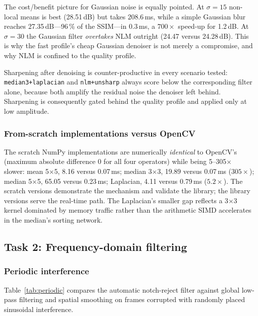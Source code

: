\documentclass[conference,10pt]{IEEEtran}
\begin{document}
The cost/benefit picture for Gaussian noise is equally pointed. At
$\sigma{=}15$ non-local means is best (28.51\,dB) but takes 208.6\,ms, while a
simple Gaussian blur reaches 27.35\,dB---96\,\% of the SSIM---in 0.3\,ms, a
$700\times$ speed-up for 1.2\,dB. At $\sigma{=}30$ the Gaussian filter
\emph{overtakes} NLM outright (24.47 versus 24.28\,dB). This is why the
\textsf{fast} profile's cheap Gaussian denoiser is not merely a compromise, and
why NLM is confined to the \textsf{quality} profile.

Sharpening after denoising is counter-productive in every scenario tested:
\texttt{median3+laplacian} and \texttt{nlm+unsharp} always score below the
corresponding filter alone, because both amplify the residual noise the
denoiser left behind. Sharpening is consequently gated behind the
\textsf{quality} profile and applied only at low amplitude.

\subsubsection{From-scratch implementations versus OpenCV}
The scratch NumPy implementations are numerically \emph{identical} to OpenCV's
(maximum absolute difference 0 for all four operators) while being
5--305$\times$ slower: mean 5$\times$5, 8.16 versus 0.07\,ms; median
3$\times$3, 19.89 versus 0.07\,ms ($305\times$); median 5$\times$5, 65.05
versus 0.23\,ms; Laplacian, 4.11 versus 0.79\,ms ($5.2\times$). The scratch
versions demonstrate the mechanism and validate the library; the library
versions serve the real-time path. The Laplacian's smaller gap reflects a
3$\times$3 kernel dominated by memory traffic rather than the arithmetic SIMD
accelerates in the median's sorting network.

\subsection{Task 2: Frequency-domain filtering}\label{sec:res-freq}
\subsubsection{Periodic interference}
Table~\ref{tab:periodic} compares the automatic notch-reject filter against
global low-pass filtering and spatial smoothing on frames corrupted with
randomly placed sinusoidal interference.
\end{document}
